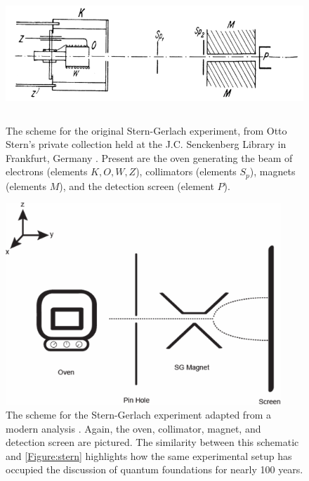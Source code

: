 \begin{figure}[!tb]
\centering\CaptionFontSize
\includegraphics[height=2.0in]
{Figure-stern}
\caption[Otto Stern's scheme for the original Stern-Gerlach experiment]
  {The scheme for the original Stern-Gerlach experiment, from Otto Stern's private collection held at the J.C. Senckenberg Library in Frankfurt, Germany \cite{bocking}. Present are the oven generating the beam of electrons (elements $K,O,W,Z$), collimators (elements $S_p$), magnets (elements $M$), and the detection screen (element $P$).}
\label{Figure:stern}
\end{figure}

\begin{figure}[!tb]
\centering\CaptionFontSize
\includegraphics[height=3.0in]
{Figure-new-stern}
\caption[Scheme for the Stern-Gerlach experiment from a modern analysis]
  {The scheme for the Stern-Gerlach experiment adapted from a modern analysis \cite{rodriguez}. Again, the oven, collimator, magnet, and detection screen are pictured. The similarity between this schematic and \autoref{Figure:stern} highlights how the same experimental setup has occupied the discussion of quantum foundations for nearly 100 years.}
\label{Figure:new stern}
\end{figure}

